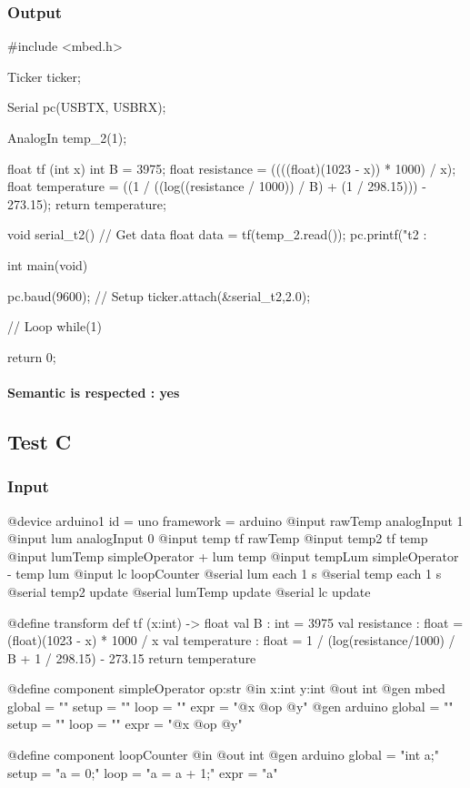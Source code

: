 \subsubsection*{Output}
\begin{cppcode}
#include <mbed.h>

Ticker ticker;

Serial pc(USBTX, USBRX);

AnalogIn temp_2(1);

float tf (int x) {
    int B = 3975;
    float resistance = ((((float)(1023 - x)) * 1000) / x);
    float temperature = ((1 / ((log((resistance / 1000)) / B) + (1 / 298.15))) - 273.15);
    return temperature;
}

void serial_t2() {
    // Get data
    float data = tf(temp_2.read());
    pc.printf("t2 : %
}

int main(void) {
    pc.baud(9600);
    // Setup
    ticker.attach(&serial_t2,2.0);

    // Loop
    while(1) {
    }

    return 0;
}
\end{cppcode}

\paragraph*{Semantic is respected : yes}
\newpage

\subsection{Test C}
\label{subsec:test_C}

\subsubsection*{Input}
\begin{apdlcode}
@device arduino1 {
    id = uno
    framework = arduino
    @input rawTemp analogInput 1
    @input lum analogInput 0
    @input temp tf rawTemp
    @input temp2 tf temp
    @input lumTemp simpleOperator + lum temp
    @input tempLum simpleOperator - temp lum
    @input lc loopCounter
    @serial lum each 1 s
    @serial temp each 1 s
    @serial temp2 update
    @serial lumTemp update
    @serial lc update
}

@define transform def tf (x:int) -> float {
    val B : int = 3975
    val resistance : float = (float)(1023 - x) * 1000 / x
    val temperature : float = 1 / (log(resistance/1000) / B + 1 / 298.15) - 273.15
    return temperature
}

@define component simpleOperator op:str {
    @in x:int y:int
    @out int
    @gen mbed {
        global = ""
        setup = ""
        loop = ""
        expr = "@x @op @y"
    }
    @gen arduino {
        global = ""
        setup = ""
        loop = ""
        expr = "@x @op @y"
    }
}

@define component loopCounter {
    @in
    @out int
    @gen arduino {
        global = "int a;"
        setup = "a = 0;"
        loop = "a = a + 1;"
        expr = "a"
  }
}
\end{apdlcode}
\newpage

